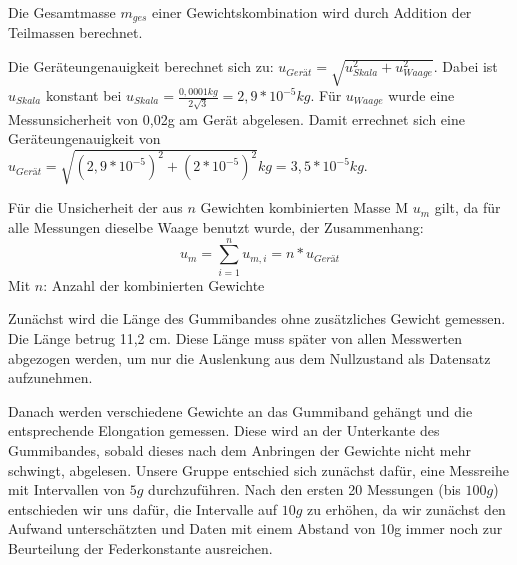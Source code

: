 \documentclass[
  9pt,
]{article}
\newenvironment{Shaded}{\begin{snugshade}}{\end{snugshade}}
\newcommand{\CommentTok}[1]{\textcolor[rgb]{0.56,0.35,0.01}{\textit{#1}}}
\newcommand{\DecValTok}[1]{\textcolor[rgb]{0.00,0.00,0.81}{#1}}
\newcommand{\FloatTok}[1]{\textcolor[rgb]{0.00,0.00,0.81}{#1}}
\newcommand{\FunctionTok}[1]{\textcolor[rgb]{0.00,0.00,0.00}{#1}}
\newcommand{\NormalTok}[1]{#1}
\newcommand{\OtherTok}[1]{\textcolor[rgb]{0.56,0.35,0.01}{#1}}
\newcommand{\SpecialCharTok}[1]{\textcolor[rgb]{0.00,0.00,0.00}{#1}}
\begin{document}
Die Gesamtmasse \(m_{ges}\) einer Gewichtskombination wird durch
Addition der Teilmassen berechnet.

Die Geräteungenauigkeit berechnet sich zu:
\(u_{Gerät}= \sqrt{u_{Skala}^2+u_{Waage}^2}\). Dabei ist \(u_{Skala}\)
konstant bei \(u_{Skala} = \frac{0,0001kg}{2\sqrt{3}}=2,9*10^{-5}kg\).
Für \(u_{Waage}\) wurde eine Messunsicherheit von 0,02g am Gerät
abgelesen. Damit errechnet sich eine Geräteungenauigkeit von
\(u_{Gerät}=\sqrt{(2,9*10^{-5})^2+(2*10^{-5})^2}kg=3,5*10^{-5}kg\).

Für die Unsicherheit der aus \(n\) Gewichten kombinierten Masse M
\(u_{m}\) gilt, da für alle Messungen dieselbe Waage benutzt wurde, der
Zusammenhang: \[u_m = \sum\limits_{i=1}^{n}u_{m,i} = n*u_{Gerät}\] Mit
\(n\): Anzahl der kombinierten Gewichte

\begin{Shaded}
\end{Shaded}

Zunächst wird die Länge des Gummibandes ohne zusätzliches Gewicht
gemessen. Die Länge betrug 11,2 cm. Diese Länge muss später von allen
Messwerten abgezogen werden, um nur die Auslenkung aus dem Nullzustand
als Datensatz aufzunehmen.

Danach werden verschiedene Gewichte an das Gummiband gehängt und die
entsprechende Elongation gemessen. Diese wird an der Unterkante des
Gummibandes, sobald dieses nach dem Anbringen der Gewichte nicht mehr
schwingt, abgelesen. Unsere Gruppe entschied sich zunächst dafür, eine
Messreihe mit Intervallen von \(5g\) durchzuführen. Nach den ersten 20
Messungen (bis \(100g\)) entschieden wir uns dafür, die Intervalle auf
\(10g\) zu erhöhen, da wir zunächst den Aufwand unterschätzten und Daten
mit einem Abstand von 10g immer noch zur Beurteilung der Federkonstante
ausreichen.
\end{document}

